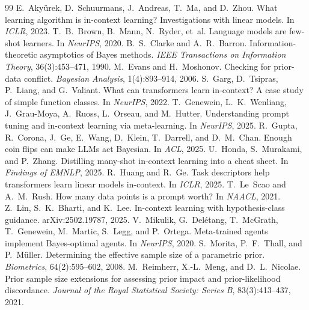 \documentclass[10pt,letterpaper]{article}
\begin{document}
\begin{thebibliography}{99}
\small
{} E.~Aky{\"u}rek, D.~Schuurmans, J.~Andreas, T.~Ma, and D.~Zhou. What learning algorithm is in-context learning? Investigations with linear models. In \emph{ICLR}, 2023.
 T.~B.~Brown, B.~Mann, N.~Ryder, et~al. Language models are few-shot learners. In \emph{NeurIPS}, 2020.
 B.~S.~Clarke and A.~R.~Barron. Information-theoretic asymptotics of Bayes methods. \emph{IEEE Transactions on Information Theory}, 36(3):453--471, 1990.
 M.~Evans and H.~Moshonov. Checking for prior-data conflict. \emph{Bayesian Analysis}, 1(4):893--914, 2006.
 S.~Garg, D.~Tsipras, P.~Liang, and G.~Valiant. What can transformers learn in-context? A case study of simple function classes. In \emph{NeurIPS}, 2022.
 T.~Genewein, L.~K.~Wenliang, J.~Grau-Moya, A.~Ruoss, L.~Orseau, and M.~Hutter. Understanding prompt tuning and in-context learning via meta-learning. In \emph{NeurIPS}, 2025.
 R.~Gupta, R.~Corona, J.~Ge, E.~Wang, D.~Klein, T.~Darrell, and D.~M.~Chan. Enough coin flips can make LLMs act Bayesian. In \emph{ACL}, 2025.
 U.~Honda, S.~Murakami, and P.~Zhang. Distilling many-shot in-context learning into a cheat sheet. In \emph{Findings of EMNLP}, 2025.
 R.~Huang and R.~Ge. Task descriptors help transformers learn linear models in-context. In \emph{ICLR}, 2025.
 T.~Le~Scao and A.~M.~Rush. How many data points is a prompt worth? In \emph{NAACL}, 2021.
 Z.~Lin, S.~K.~Bharti, and K.~Lee. In-context learning with hypothesis-class guidance. arXiv:2502.19787, 2025.
 V.~Mikulik, G.~Del{\'e}tang, T.~McGrath, T.~Genewein, M.~Martic, S.~Legg, and P.~Ortega. Meta-trained agents implement Bayes-optimal agents. In \emph{NeurIPS}, 2020.
 S.~Morita, P.~F.~Thall, and P.~M{\"u}ller. Determining the effective sample size of a parametric prior. \emph{Biometrics}, 64(2):595--602, 2008.
 M.~Reimherr, X.-L.~Meng, and D.~L.~Nicolae. Prior sample size extensions for assessing prior impact and prior-likelihood discordance. \emph{Journal of the Royal Statistical Society: Series B}, 83(3):413--437, 2021.

\end{thebibliography}
\end{document}
